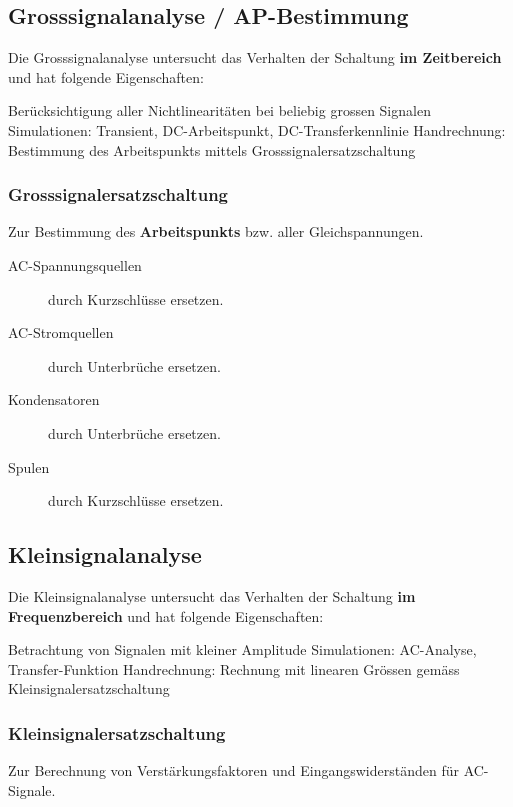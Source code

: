 \subsection{Grosssignalanalyse / AP-Bestimmung}
\label{Grosssignalanalyse / AP-Bestimmung}

Die Grosssignalanalyse untersucht das Verhalten der Schaltung \textbf{im Zeitbereich} und hat folgende Eigenschaften:

\smallskip

\begin{outline}
    \1 Berücksichtigung aller Nichtlinearitäten bei beliebig grossen Signalen
    \1 Simulationen: Transient, DC-Arbeitspunkt, DC-Transferkennlinie
    \1 Handrechnung: Bestimmung des Arbeitspunkts mittels Grosssignalersatzschaltung
\end{outline}


\subsubsection{Grosssignalersatzschaltung}
\label{Grosssignalersatzschaltung}

Zur Bestimmung des \textbf{Arbeitspunkts} bzw. aller Gleichspannungen.
\begin{description}
    \item[AC-Spannungsquellen] durch Kurzschlüsse ersetzen.
    \item[AC-Stromquellen] durch Unterbrüche ersetzen. 
    \item[Kondensatoren] durch Unterbrüche ersetzen.
    \item[Spulen] durch Kurzschlüsse ersetzen.  
\end{description}


\subsection{Kleinsignalanalyse}
\label{Kleinsignalanalyse}

Die Kleinsignalanalyse untersucht das Verhalten der Schaltung \textbf{im Frequenzbereich} und hat folgende Eigenschaften:

\smallskip

\begin{outline}
    \1 Betrachtung von Signalen mit kleiner Amplitude
    \1 Simulationen: AC-Analyse, Transfer-Funktion
    \1 Handrechnung: Rechnung mit linearen Grössen gemäss Kleinsignalersatzschaltung
\end{outline}


\subsubsection{Kleinsignalersatzschaltung}
\label{Kleinsignalersatzschaltung}
Zur Berechnung von Verstärkungsfaktoren und Eingangswiderständen für AC-Signale.


